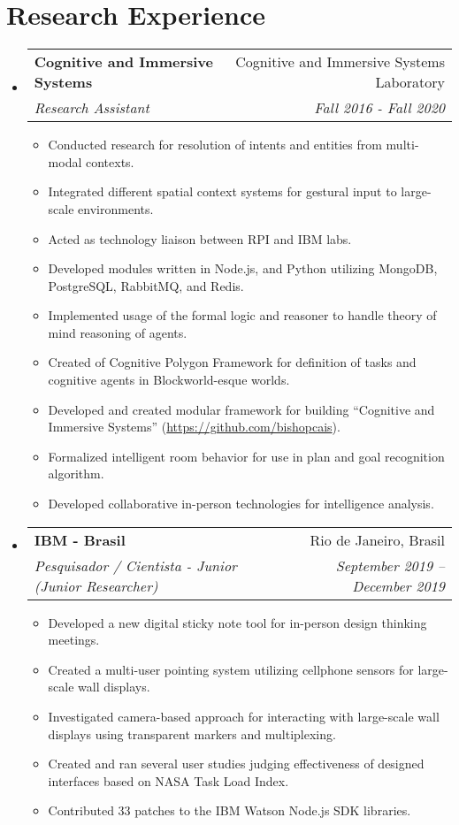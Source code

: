 \documentclass[letterpaper,11pt]{article}
\makeatletter
\newcommand{\resumeItemNew}[1]{
  \item\small{
    {#1 \vspace{-2pt}}
  }
}
\newcommand{\resumeSubheading}[4]{
  \vspace{-1pt}\item
    \begin{tabular*}{0.97\textwidth}{l@{\extracolsep{\fill}}r}
      \textbf{#1} & #2 \\
      \textit{\small #3} & \textit{\small #4} \\
    \end{tabular*}\vspace{-5pt}
}
\newcommand{\resumeSubHeadingListStart}{\begin{itemize}[leftmargin=*]}
\newcommand{\resumeSubHeadingListEnd}{\end{itemize}}
\newcommand{\resumeItemListStart}{\begin{itemize}}
\newcommand{\resumeItemListEnd}{\end{itemize}\vspace{-5pt}}
\makeatother
\begin{document}
\section{Research Experience}
  \resumeSubHeadingListStart
    \resumeSubheading
      {Cognitive and Immersive Systems}{Cognitive and Immersive Systems Laboratory}
      {Research Assistant}{Fall 2016 - Fall 2020}
        \resumeItemListStart
          \resumeItemNew{Conducted research for resolution of intents and entities from multi-modal contexts.}
          \resumeItemNew{Integrated different spatial context systems for gestural input to large-scale environments.}
          \resumeItemNew{Acted as technology liaison between RPI and IBM labs.}
          \resumeItemNew{Developed modules written in Node.js, and Python utilizing MongoDB, PostgreSQL, RabbitMQ, and Redis.}
          \resumeItemNew{Implemented usage of the formal logic and reasoner to handle theory of mind reasoning of agents.}
          \resumeItemNew{Created of Cognitive Polygon Framework for definition of tasks and cognitive agents in Blockworld-esque worlds.}
          \resumeItemNew{Developed and created modular framework for building ``Cognitive and Immersive Systems'' (\url{https://github.com/bishopcais}).}
          \resumeItemNew{Formalized intelligent room behavior for use in plan and goal recognition algorithm.}
          \resumeItemNew{Developed collaborative in-person technologies for intelligence analysis.}
        \resumeItemListEnd

    \resumeSubheading
      {IBM - Brasil}{Rio de Janeiro, Brasil}
      {Pesquisador / Cientista - Junior (Junior Researcher)}{September 2019 -- December 2019}
      \resumeItemListStart
        \resumeItemNew{Developed a new digital sticky note tool for in-person design thinking meetings.}
        \resumeItemNew{Created a multi-user pointing system utilizing cellphone sensors for large-scale wall displays.}
        \resumeItemNew{Investigated camera-based approach for interacting with large-scale wall displays using transparent markers and multiplexing.}
        \resumeItemNew{Created and ran several user studies judging effectiveness of designed interfaces based on NASA Task Load Index.}
        \resumeItemNew{Contributed 33 patches to the IBM Watson Node.js SDK libraries.}
      \resumeItemListEnd
  \resumeSubHeadingListEnd

\end{document}
